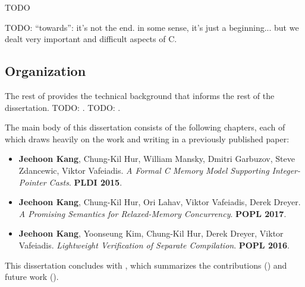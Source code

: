 TODO

TODO: ``towards'': it's not the end.  in some sense, it's just a beginning...  but we dealt very
important and difficult aspects of C.


\subsection{Organization}

The rest of  provides the technical background that informs the rest of the
dissertation.  TODO: .  TODO: .

The main body of this dissertation consists of the following chapters, each of which draws heavily
on the work and writing in a previously published paper:

\begin{itemize}
\item {}

  \cite{intptrcast} \textbf{Jeehoon Kang}, Chung-Kil Hur, William Mansky, Dmitri Garbuzov,
  Steve Zdancewic, Viktor Vafeiadis.  \emph{A Formal C Memory Model Supporting Integer-Pointer
    Casts}.  \textbf{PLDI 2015}.  

\item {}

  \cite{promising} \textbf{Jeehoon Kang}, Chung-Kil Hur, Ori Lahav, Viktor Vafeiadis, Derek
  Dreyer.  \emph{A Promising Semantics for Relaxed-Memory Concurrency}.  \textbf{POPL 2017}.

\item {}

  \cite{sepcomp} \textbf{Jeehoon Kang}, Yoonseung Kim, Chung-Kil Hur, Derek Dreyer, Viktor
  Vafeiadis.  \emph{Lightweight Verification of Separate Compilation}.  \textbf{POPL 2016}.
\end{itemize}

This dissertation concludes with , which summarizes the contributions
() and future work ().


%


